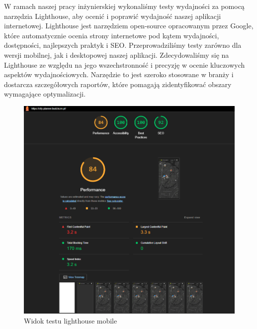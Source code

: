 W ramach naszej pracy inżynierskiej wykonaliśmy testy wydajności za pomocą narzędzia Lighthouse, aby ocenić i poprawić wydajność naszej aplikacji internetowej. \newline
Lighthouse jest narzędziem open-source opracowanym przez Google, które automatycznie ocenia strony internetowe pod kątem wydajności, dostępności, najlepszych praktyk i SEO. \newline
Przeprowadziliśmy testy zarówno dla wersji mobilnej, jak i desktopowej naszej aplikacji. \newline
Zdecydowaliśmy się na Lighthouse ze względu na jego wszechstronność i precyzję w ocenie kluczowych aspektów wydajnościowych.  \newline
Narzędzie to jest szeroko stosowane w branży i dostarcza szczegółowych raportów, które pomagają zidentyfikować obszary wymagające optymalizacji. \newline
\begin{figure}[H]
    \centering
    \includegraphics[width=1\textwidth]{attachments/lighthouse-mobile}
    \caption{Widok testu lighthouse mobile}
    \label{fig:testy-lighthouse-mobile}
    \end{figure}

